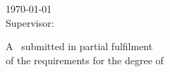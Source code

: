 \begin{titlepage}
    
    {\large \today}\\[2cm] %
    
    \vfill
     Supervisor: \supervisor
    
     
    \vfill
     A \typeofthesis\ submitted in partial fulfilment\\of the requirements for the degree of\\
    \degree
    
    \vfill %
    
    \end{titlepage}